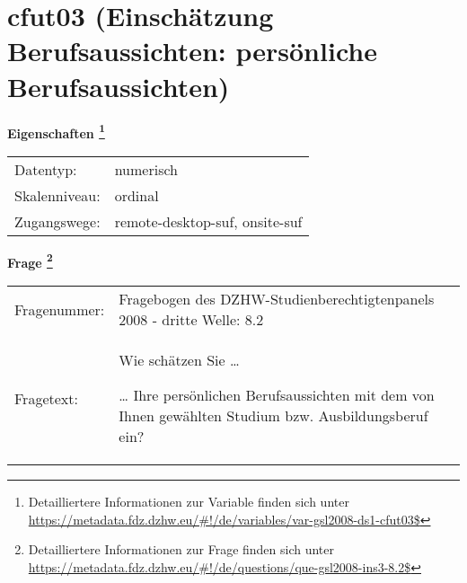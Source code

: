 
    \setcounter{footnote}{0}

    \vspace*{-1.8cm}
	\section{cfut03 (Einschätzung Berufsaussichten: persönliche Berufsaussichten)}
	\label{section:cfut03}



    \vspace*{0.5cm}
    \noindent\textbf{Eigenschaften
	\footnote{Detailliertere Informationen zur Variable finden sich unter
		\url{https://metadata.fdz.dzhw.eu/\#!/de/variables/var-gsl2008-ds1-cfut03$}}}\\
	\begin{tabularx}{\hsize}{@{}lX}
	Datentyp: & numerisch \\
	Skalenniveau: & ordinal \\
	Zugangswege: &
	  remote-desktop-suf, 
	  onsite-suf
 \\
    \end{tabularx}



				\vspace*{0.5cm}
                \noindent\textbf{Frage
	                \footnote{Detailliertere Informationen zur Frage finden sich unter
		              \url{https://metadata.fdz.dzhw.eu/\#!/de/questions/que-gsl2008-ins3-8.2$}}}\\
				\begin{tabularx}{\hsize}{@{}lX}
					Fragenummer: &
					  Fragebogen des DZHW-Studienberechtigtenpanels 2008 - dritte Welle:
					  8.2
 \\
					Fragetext: & Wie schätzen Sie …\par  … Ihre persönlichen Berufsaussichten mit dem von Ihnen gewählten Studium bzw. Ausbildungsberuf ein? \\
				\end{tabularx}





